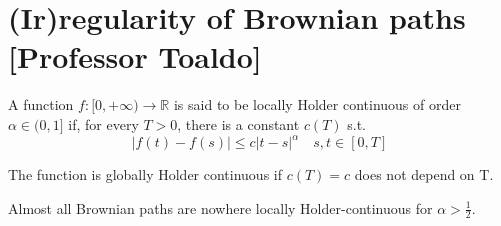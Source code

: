 \chapter{(Ir)regularity of Brownian paths [Professor Toaldo]}
\begin{DefBox}
    \begin{Def}
    A function $f:[0,+\infty) \rightarrow \mathbb{R}$ is said to be locally Holder continuous of order $\alpha \in (0,1]$ if, for every $T>0$, there is a constant $c(T)$ s.t.
    \begin{equation*}
        |f(t)-f(s)| \leq c|t-s|^\alpha \quad s,t \in [0,T]
    \end{equation*}
\end{Def}
\end{DefBox}
The function is globally Holder continuous if $c(T) = c$ does not depend on T. 
\begin{ThBox}
    \begin{Th}
    Almost all Brownian paths are nowhere locally Holder-continuous for $\alpha>\frac{1}{2}$.
\end{Th}
\end{ThBox}
